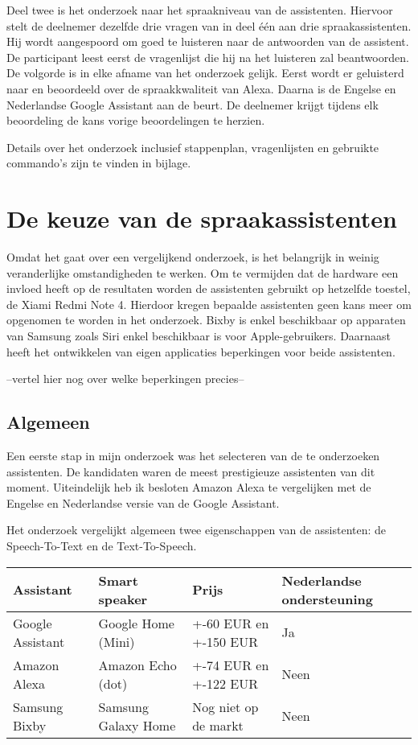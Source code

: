 Deel twee is het onderzoek naar het spraakniveau van de assistenten. Hiervoor stelt de deelnemer dezelfde drie vragen van in deel één aan drie spraakassistenten. Hij wordt aangespoord om goed te luisteren naar de antwoorden van de assistent. De participant leest eerst de vragenlijst die hij na het luisteren zal beantwoorden. De volgorde is in elke afname van het onderzoek gelijk. Eerst wordt er geluisterd naar en beoordeeld over de spraakkwaliteit van Alexa. Daarna is de Engelse en Nederlandse Google Assistant aan de beurt. De deelnemer krijgt tijdens elk beoordeling de kans vorige beoordelingen te herzien.

Details over het onderzoek inclusief stappenplan, vragenlijsten en gebruikte commando's zijn te vinden in bijlage.

\section{De keuze van de spraakassistenten}
Omdat het gaat over een vergelijkend onderzoek, is het belangrijk in weinig veranderlijke omstandigheden te werken. Om te vermijden dat de hardware een invloed heeft op de resultaten worden de assistenten gebruikt op hetzelfde toestel, de Xiami Redmi Note 4. Hierdoor kregen bepaalde assistenten geen kans meer om opgenomen te worden in het onderzoek. Bixby is enkel beschikbaar op apparaten van Samsung zoals Siri enkel beschikbaar is voor Apple-gebruikers. Daarnaast heeft het ontwikkelen van eigen applicaties beperkingen voor beide assistenten.

--vertel hier nog over welke beperkingen precies--


\subsection{Algemeen}
\label{sec:algemeen}
Een eerste stap in mijn onderzoek was het selecteren van de te onderzoeken assistenten. De kandidaten waren de meest prestigieuze assistenten van dit moment. Uiteindelijk heb ik besloten Amazon Alexa te vergelijken met de Engelse en Nederlandse versie van de Google Assistant.

Het onderzoek vergelijkt algemeen twee eigenschappen van de assistenten: de Speech-To-Text en de Text-To-Speech. 

\begin{center}
    \begin{tabular}{ | l | l | l | l |}
        \hline
        Assistant & Smart speaker & Prijs & Nederlandse ondersteuning\\ \hline
        Google Assistant & Google Home (Mini) & +-60 EUR en +-150 EUR & Ja \\ \hline
        Amazon Alexa & Amazon Echo (dot) & +-74 EUR en +-122 EUR & Neen \\ \hline
        Samsung Bixby & Samsung Galaxy Home & Nog niet op de markt & Neen\\ \hline
    \end{tabular}
\end{center}

